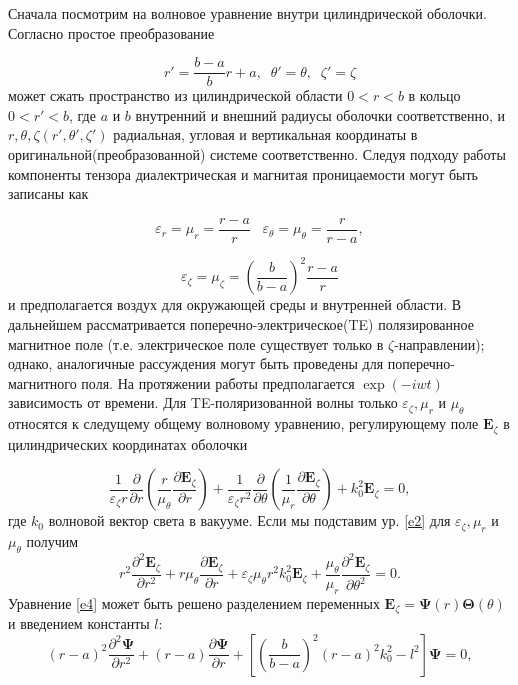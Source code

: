 \documentclass[a4paper, 12pt]{article}
\begin{document}
Сначала посмотрим на волновое уравнение внутри цилиндрической оболочки. Согласно \cite{1} простое преобразование

\begin{equation}\label{e1}
	r' = \frac{b-a}{b}r+a, \;\; \theta' = \theta, \;\; \zeta' = \zeta
\end{equation}
может сжать пространство из цилиндрической области $0 < r < b$ в кольцо $0 < r' < b$, где $a$ и $b$ внутренний и
внешний радиусы оболочки соответственно, и $r, \theta, \zeta (r', \theta', \zeta')$ радиальная, угловая и вертикальная
координаты в оригинальной(преобразованной) системе соответственно. Следуя подходу работы \cite{1} компоненты тензора 
диалектрическая и магнитая проницаемости могут быть записаны как 

\begin{equation*}
	\varepsilon_r = \mu_r = \frac{r-a}{r} \;\;\; \varepsilon_\theta = \mu_\theta = \frac{r}{r-a},	
\end{equation*}  

\begin{equation}\label{e2}
	\varepsilon_\zeta = \mu_\zeta = (\frac{b}{b-a})^2 \frac{r-a}{r}
\end{equation}
и предполагается воздух для окружающей среды и внутренней области. В дальнейшем рассматривается 
поперечно-электрическое(TE) полязированное магнитное поле (т.е. электрическое поле существует только в 
$\zeta$-направлении); однако, аналогичные рассуждения могут быть проведены для поперечно-магнитного поля. На протяжении
работы предполагается $\exp(-iwt)$ зависимость от времени. Для TE-поляризованной волны только $\varepsilon_\zeta, \mu_r$
и $\mu_\theta$ относятся к следущему общему волновому уравнению, регулирующему поле $\textbf{E}_\zeta$ в цилиндрических 
координатах оболочки

\begin{equation}\label{e3}
	\frac{1}{\varepsilon_\zeta r} \frac{\partial}{\partial r}(\frac{r}{\mu_\theta}\frac{\partial \textbf{E}_\zeta}
	{\partial r}) +
	\frac{1}{\varepsilon_\zeta r^2} \frac{\partial}{\partial \theta}(\frac{1}{\mu_r}\frac{\partial \textbf{E}_\zeta}
	{\partial \theta}) + k_0^2 \textbf{E}_\zeta = 0,
\end{equation}
где $k_0$ волновой вектор света в вакууме. Если мы подставим ур. \eqref{e2} для $\varepsilon_\zeta, \mu_r$ и 
$\mu_\theta$ получим
\begin{equation}\label{e4}
	r^2 \frac{\partial^2 \textbf{E}_\zeta}{\partial r^2} + r\mu_\theta \frac{\partial \textbf{E}_\zeta}{\partial r} + 
	\varepsilon_\zeta \mu_\theta r^2 k_0^2 \textbf{E}_\zeta + \frac{\mu_\theta}{\mu_r} \frac{\partial^2 
	\textbf{E}_\zeta}{\partial \theta^2} = 0.
\end{equation}
Уравнение \eqref{e4} может быть решено разделением переменных
$ \textbf{E}_\zeta = \mathbf{\Psi}(r) \mathbf{\Theta}(\theta)$ и введением константы $l$:
\begin{equation}\label{e5}
	(r-a)^2 \frac{\partial^2 \mathbf{\Psi}}{\partial r^2} + (r-a) \frac{\partial \mathbf{\Psi}}{\partial r} +
	\left[ (\frac{b}{b-a})^2(r-a)^2 k_0^2-l^2\right] \mathbf{\Psi} = 0,
\end{equation}
\end{document}
